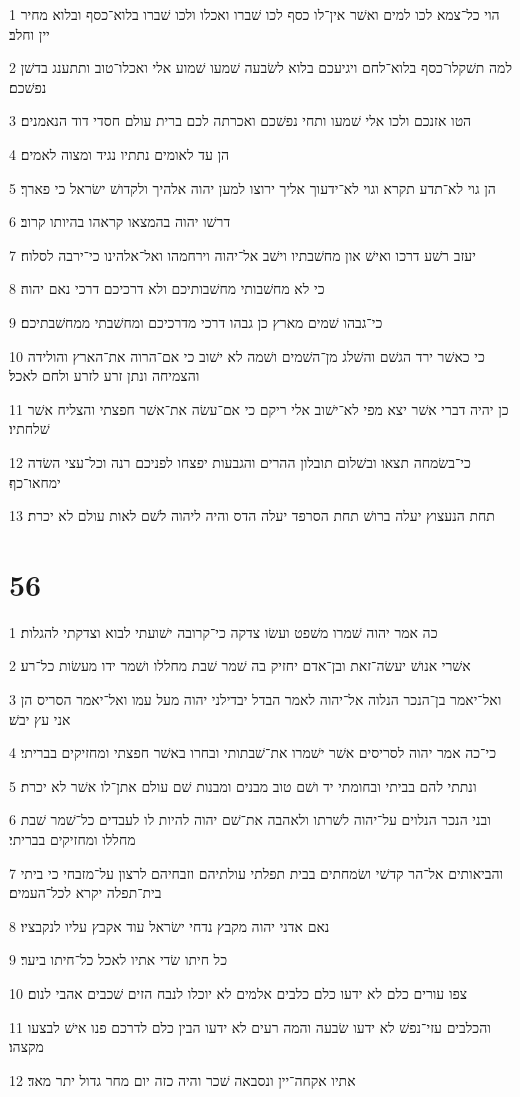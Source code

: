 \par 1 הוי כל־צמא לכו למים ואשׁר אין־לו כסף לכו שׁברו ואכלו ולכו שׁברו בלוא־כסף ובלוא מחיר יין וחלב׃
\par 2 למה תשׁקלו־כסף בלוא־לחם ויגיעכם בלוא לשׂבעה שׁמעו שׁמוע אלי ואכלו־טוב ותתענג בדשׁן נפשׁכם׃
\par 3 הטו אזנכם ולכו אלי שׁמעו ותחי נפשׁכם ואכרתה לכם ברית עולם חסדי דוד הנאמנים׃
\par 4 הן עד לאומים נתתיו נגיד ומצוה לאמים׃
\par 5 הן גוי לא־תדע תקרא וגוי לא־ידעוך אליך ירוצו למען יהוה אלהיך ולקדושׁ ישׂראל כי פארך׃
\par 6 דרשׁו יהוה בהמצאו קראהו בהיותו קרוב׃
\par 7 יעזב רשׁע דרכו ואישׁ און מחשׁבתיו וישׁב אל־יהוה וירחמהו ואל־אלהינו כי־ירבה לסלוח׃
\par 8 כי לא מחשׁבותי מחשׁבותיכם ולא דרכיכם דרכי נאם יהוה׃
\par 9 כי־גבהו שׁמים מארץ כן גבהו דרכי מדרכיכם ומחשׁבתי ממחשׁבתיכם׃
\par 10 כי כאשׁר ירד הגשׁם והשׁלג מן־השׁמים ושׁמה לא ישׁוב כי אם־הרוה את־הארץ והולידה והצמיחה ונתן זרע לזרע ולחם לאכל׃
\par 11 כן יהיה דברי אשׁר יצא מפי לא־ישׁוב אלי ריקם כי אם־עשׂה את־אשׁר חפצתי והצליח אשׁר שׁלחתיו׃
\par 12 כי־בשׂמחה תצאו ובשׁלום תובלון ההרים והגבעות יפצחו לפניכם רנה וכל־עצי השׂדה ימחאו־כף׃
\par 13 תחת הנעצוץ יעלה ברושׁ תחת הסרפד יעלה הדס והיה ליהוה לשׁם לאות עולם לא יכרת׃

\chapter{56}

\par 1 כה אמר יהוה שׁמרו משׁפט ועשׂו צדקה כי־קרובה ישׁועתי לבוא וצדקתי להגלות׃
\par 2 אשׁרי אנושׁ יעשׂה־זאת ובן־אדם יחזיק בה שׁמר שׁבת מחללו ושׁמר ידו מעשׂות כל־רע׃
\par 3 ואל־יאמר בן־הנכר הנלוה אל־יהוה לאמר הבדל יבדילני יהוה מעל עמו ואל־יאמר הסריס הן אני עץ יבשׁ׃
\par 4 כי־כה אמר יהוה לסריסים אשׁר ישׁמרו את־שׁבתותי ובחרו באשׁר חפצתי ומחזיקים בבריתי׃
\par 5 ונתתי להם בביתי ובחומתי יד ושׁם טוב מבנים ומבנות שׁם עולם אתן־לו אשׁר לא יכרת׃
\par 6 ובני הנכר הנלוים על־יהוה לשׁרתו ולאהבה את־שׁם יהוה להיות לו לעבדים כל־שׁמר שׁבת מחללו ומחזיקים בבריתי׃
\par 7 והביאותים אל־הר קדשׁי ושׂמחתים בבית תפלתי עולתיהם וזבחיהם לרצון על־מזבחי כי ביתי בית־תפלה יקרא לכל־העמים׃
\par 8 נאם אדני יהוה מקבץ נדחי ישׂראל עוד אקבץ עליו לנקבציו׃
\par 9 כל חיתו שׂדי אתיו לאכל כל־חיתו ביער׃
\par 10 צפו עורים כלם לא ידעו כלם כלבים אלמים לא יוכלו לנבח הזים שׁכבים אהבי לנום׃
\par 11 והכלבים עזי־נפשׁ לא ידעו שׂבעה והמה רעים לא ידעו הבין כלם לדרכם פנו אישׁ לבצעו מקצהו׃
\par 12 אתיו אקחה־יין ונסבאה שׁכר והיה כזה יום מחר גדול יתר מאד׃

